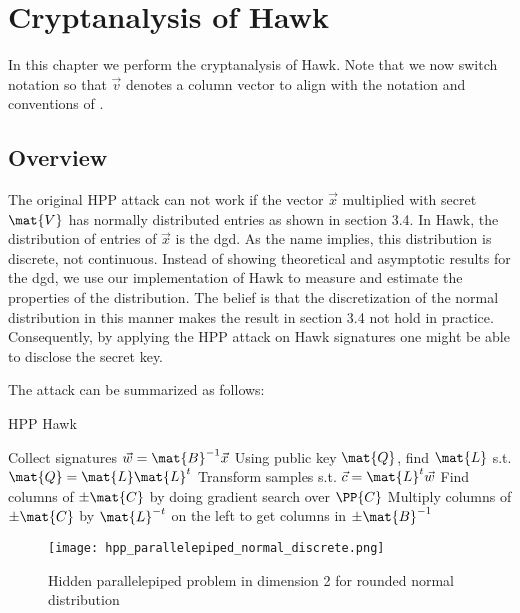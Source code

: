 \chapter{Cryptanalysis of Hawk}
In this chapter we perform the cryptanalysis of Hawk. Note that we now switch notation so that $\vec{v}$ denotes a column vector to align with the notation and conventions of \cite{HawkSpec24}.
\section{Overview}

The original HPP attack can not work if the vector $\vec{x}$ multiplied with secret $\mat{V}$ has normally distributed entries as shown in section 3.4.
In Hawk, the distribution of entries of $\vec{x}$ is the \gls{dgd}. As the name implies, this distribution is discrete, not continuous. 
Instead of showing theoretical and asymptotic results for the \gls{dgd}, we use our implementation of Hawk to measure and estimate the properties of the distribution.
The belief is that the discretization of the normal distribution in this manner makes the result in section 3.4 not hold in practice. 
Consequently, by applying the HPP attack on Hawk signatures one might be able to disclose the secret key.

The attack can be summarized as follows: 
\begin{algorithm}
\caption{HPP Hawk}
\begin{algorithmic}[1]
        \State Collect signatures $\vec{w} = \mat{B}^{-1} \vec{x}$
        \State Using public key $\mat{Q}$, find $\mat{L}$ s.t. $\mat{Q} = \mat{L} \mat{L}^t$
        \State Transform samples s.t. $\vec{c} = \mat{L}^t \vec{w}$
        \State Find columns of $\pm \mat{C}$ by doing gradient search over $\PP{C}$
        \State Multiply columns of $\pm \mat{C}$ by $\mat{L}^{-t}$ on the left to get columns in $\pm \mat{B}^{-1}$
\end{algorithmic}
\end{algorithm}

\begin{figure}[H]
    \centering
    \texttt{[image: hpp\_parallelepiped\_normal\_discrete.png]}
    \caption{Hidden parallelepiped problem in dimension 2 for rounded normal distribution}
  	\medskip 
\end{figure}

